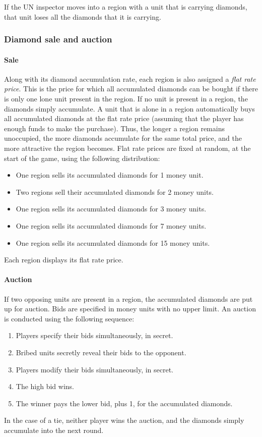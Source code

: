 \documentclass[12pt]{article}
\begin{document}
If the UN inspector moves into a region with a unit that is carrying diamonds, that unit loses all the diamonds that it is carrying.


\subsubsection{Diamond sale and auction}

\paragraph{Sale}
Along with its diamond accumulation rate, each region is also assigned a {\it flat rate price}.  This is the price for which all accumulated diamonds can be bought if there is only one lone unit present in the region.  If no unit is present in a region, the diamonds simply accumulate.  A unit that is alone in a region automatically buys all accumulated diamonds at the flat rate price (assuming that the player has enough funds to make the purchase).  Thus, the longer a region remains unoccupied, the more diamonds accumulate for the same total price, and the more attractive the region becomes.  Flat rate prices are fixed at random, at the start of the game, using the following distribution:
\begin{itemize}
\item One region sells its accumulated diamonds for 1 money unit.
\item Two regions sell their accumulated diamonds for 2 money units.
\item One region sells its accumulated diamonds for 3 money units.
\item One region sells its accumulated diamonds for 7 money units.
\item One region sells its accumulated diamonds for 15 money units.
\end{itemize}
Each region displays its flat rate price.

\paragraph{Auction}
If two opposing units are present in a region, the accumulated diamonds are put up for auction.  Bids are specified in money units with no upper limit.  An auction is conducted using the following sequence:
\begin{enumerate}
\item Players specify their bids simultaneously, in secret.
\item Bribed units secretly reveal their bids to the opponent.
\item Players modify their bids simultaneously, in secret.
\item The high bid wins.
\item The winner pays the lower bid, plus 1, for the accumulated diamonds.
\end{enumerate}
In the case of a tie, neither player wins the auction, and the diamonds simply accumulate into the next round.
\end{document}
